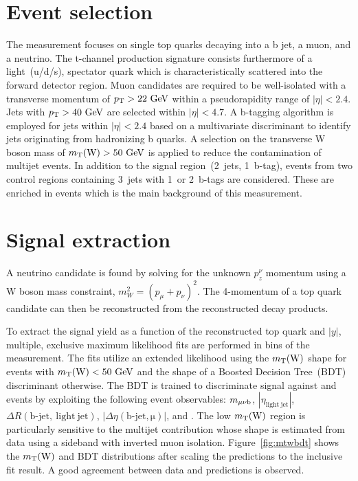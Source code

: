 \documentclass[12pt]{article}
\begin{document}
\section{Event selection}

The measurement focuses on single top quarks decaying into a b jet, a muon, and a neutrino. The t-channel production signature consists furthermore of a light~(u/d/s), spectator quark which is characteristically scattered into the forward detector region. Muon candidates are required to be well-isolated with a transverse momentum of $p_\mathrm{T}>22~\mathrm{GeV}$ within a pseudorapidity range of $|\eta|<2.4$. Jets with $p_\mathrm{T}>40~\mathrm{GeV}$ are selected within $|\eta|<4.7$. A b-tagging algorithm is employed for jets within $|\eta|<2.4$ based on a multivariate discriminant to identify jets originating from hadronizing b quarks. A selection on the transverse W boson mass of $m_{\mathrm{T}}(\mathrm{W})>50~\mathrm{GeV}$ is applied to reduce the contamination of multijet events. In addition to the signal region~(2~jets, 1~b-tag), events from two control regions containing 3~jets with 1~or 2~b-tags are considered. These are enriched in \ttbar events which is the main background of this measurement.


\section{Signal extraction}

A neutrino candidate is found by solving for the unknown $p_{z}^{\nu}$ momentum using a W boson mass constraint, $m_{W}^{2}=(p_{\mu}+p_{\nu})^{2}$. The 4-momentum of a top quark candidate can then be reconstructed from the reconstructed decay products.

To extract the signal yield as a function of the reconstructed top quark \pt and $|y|$, multiple, exclusive maximum likelihood fits are performed in bins of the measurement. The fits utilize an extended likelihood using the $m_{\mathrm{T}}(\mathrm{W})$ shape for events with $m_{\mathrm{T}}(\mathrm{W})<50~\mathrm{GeV}$ and the shape of a Boosted Decision Tree~(BDT) discriminant otherwise. The BDT is trained to discriminate signal against \ttbar and \wjets events by exploiting the following event observables: $m_{\mu\nu \mathrm{b}}$, $|\eta_\mathrm{light~jet}|$, $\Delta R(\mathrm{b\mbox{-}jet,~light~jet})$, $|\Delta\eta(\mathrm{b\mbox{-}jet,\mu})|$, and \mtw. The low $m_{\mathrm{T}}(\mathrm{W})$ region is particularly sensitive to the multijet contribution whose shape is estimated from data using a sideband with inverted muon isolation. Figure~\ref{fig:mtwbdt} shows the $m_{\mathrm{T}}(\mathrm{W})$ and BDT distributions after scaling the predictions to the inclusive fit result. A good agreement between data and predictions is observed.
\end{document}
